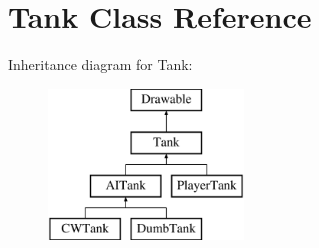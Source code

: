 \hypertarget{class_tank}{}\section{Tank Class Reference}
\label{class_tank}
Inheritance diagram for Tank\+:\begin{figure}[H]
\begin{center}
\leavevmode
\includegraphics[height=4.000000cm]{class_tank}
\end{center}
\end{figure}
